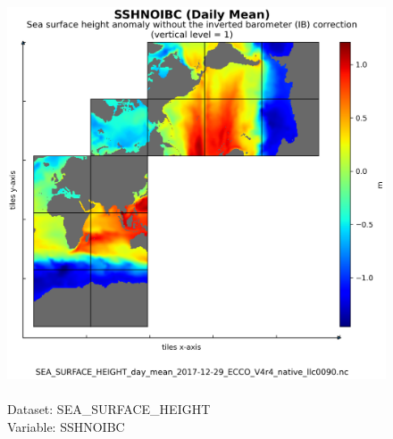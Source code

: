 \begin{figure}[H]
\centering
\includegraphics[scale=0.5]{../images/plots/native_plots/Sea_Surface_Height/SSHNOIBC.png}
\caption{\\Dataset: SEA\_SURFACE\_HEIGHT\\Variable: SSHNOIBC}
\label{tab:table-SEA_SURFACE_HEIGHT_SSHNOIBC-Plot}
\end{figure}